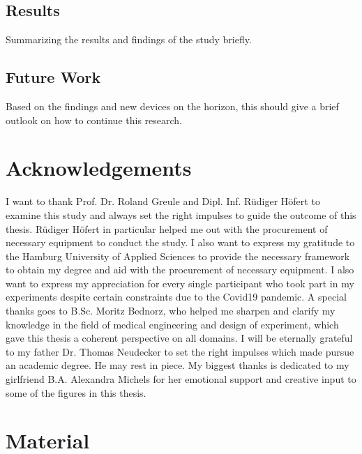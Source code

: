         \section{Results}

            Summarizing the results and findings of the study briefly.

        \section{Future Work}


            Based on the findings and new devices on the horizon, this should give a brief outlook on how to continue this research.

    \chapter{Acknowledgements}

        I want to thank Prof. Dr. Roland Greule and Dipl. Inf. Rüdiger Höfert to examine this study and always set the right impulses to guide the outcome of this thesis. Rüdiger Höfert in particular helped me out with the procurement of necessary equipment to conduct the study. I also want to express my gratitude to the Hamburg University of Applied Sciences to provide the necessary framework to obtain my degree and aid with the procurement of necessary equipment. I also want to express my appreciation for every single participant who took part in my experiments despite certain constraints due to the Covid19 pandemic.
        A special thanks goes to B.Sc. Moritz Bednorz, who helped me sharpen and clarify my knowledge in the field of medical engineering and design of experiment, which gave this thesis a coherent perspective on all domains. 
        I will be eternally grateful to my father Dr. Thomas Neudecker to set the right impulses which made pursue an academic degree. He may rest in piece. 
        My biggest thanks is dedicated to my girlfriend B.A. Alexandra Michels for her emotional support and creative input to some of the figures in this thesis.

    \appendix

        \chapter{Material}

